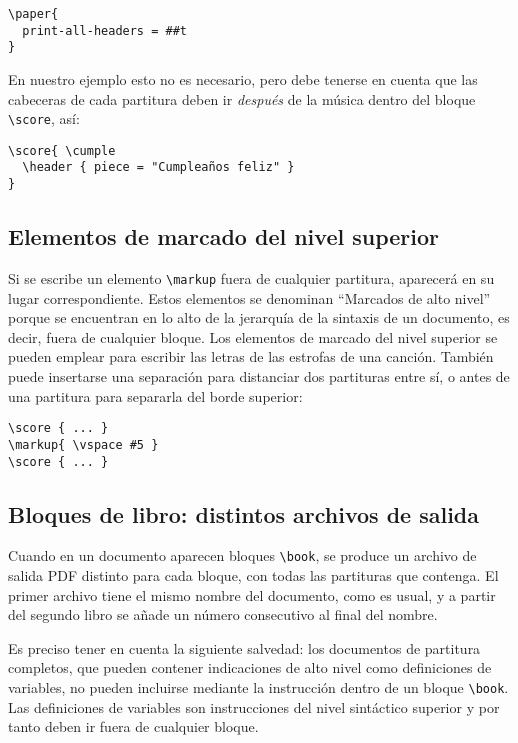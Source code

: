 \begin{verbatim}
\paper{
  print-all-headers = ##t
}
\end{verbatim}

En nuestro ejemplo esto no es necesario, pero debe tenerse en cuenta
que las cabeceras de cada partitura deben ir \emph{después} de la
música dentro del bloque \verb+\score+, así:

\begin{verbatim}
\score{ \cumple
  \header { piece = "Cumpleaños feliz" }
}
\end{verbatim}


\subsection{Elementos de marcado del nivel superior}

Si se escribe un elemento \verb+\markup+ fuera de cualquier partitura,
aparecerá en su lugar correspondiente.  Estos elementos se denominan
``Marcados de alto nivel'' porque se encuentran en lo alto de la
jerarquía de la sintaxis de un documento, es decir, fuera de cualquier
bloque.  Los elementos de marcado del nivel superior se pueden emplear
para escribir las letras de las estrofas de una canción.  También
puede insertarse una separación para distanciar dos partituras entre
sí, o antes de una partitura para separarla del borde superior:

\begin{verbatim}
\score { ... }
\markup{ \vspace #5 }
\score { ... }
\end{verbatim}

\subsection{Bloques de libro: distintos archivos de salida}

Cuando en un documento aparecen bloques \verb+\book+, se produce un
archivo de salida PDF distinto para cada bloque, con todas las
partituras que contenga.  El primer archivo tiene el mismo nombre del
documento, como es usual, y a partir del segundo libro se añade un
número consecutivo al final del nombre.

Es preciso tener en cuenta la siguiente salvedad: los documentos de
partitura completos, que pueden contener indicaciones de alto nivel
como definiciones de variables, no pueden incluirse mediante la
instrucción \verb++ dentro de un bloque \verb+\book+.  Las
definiciones de variables son instrucciones del nivel sintáctico
superior y por tanto deben ir fuera de cualquier bloque.

